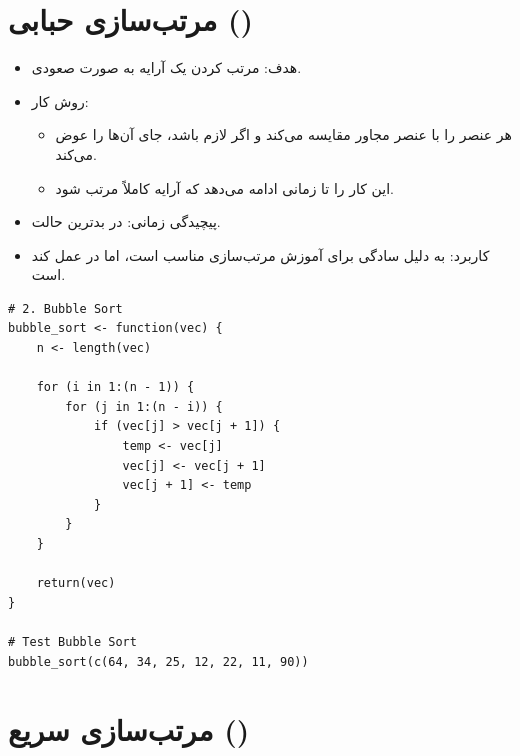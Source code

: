 \documentclass[11pt, a4paper, oneside]{book}
\begin{document}
		
		\section{مرتب‌سازی حبابی ()}
			
			
			\begin{itemize}
				
				\item {\large هدف}:
				مرتب کردن یک آرایه به صورت صعودی.
				
				\item {\large روش کار}: \par
				
				\begin{itemize}
					
					\item هر عنصر را با عنصر مجاور مقایسه می‌کند و اگر لازم باشد، جای آن‌ها را عوض می‌کند.
					
					\item این کار را تا زمانی ادامه می‌دهد که آرایه کاملاً مرتب شود.
					
				\end{itemize}
				
				\item {\large پیچیدگی زمانی}:
				 در بدترین حالت.
				
				\item {\large کاربرد}:
				به دلیل سادگی برای آموزش مرتب‌سازی مناسب است، اما در عمل کند است.
				
			\end{itemize}
			
			\begin{latin}
				\begin{lstlisting}[caption={\lr{Bubble Sort}}] 
# 2. Bubble Sort
bubble_sort <- function(vec) {
	n <- length(vec)
	
	for (i in 1:(n - 1)) {
		for (j in 1:(n - i)) {
			if (vec[j] > vec[j + 1]) {
				temp <- vec[j]
				vec[j] <- vec[j + 1]
				vec[j + 1] <- temp
			}
		}
	}
	
	return(vec)
}

# Test Bubble Sort
bubble_sort(c(64, 34, 25, 12, 22, 11, 90))

				\end{lstlisting}
			\end{latin}
			
		
		\section{مرتب‌سازی سریع ()}
			
\end{document}
